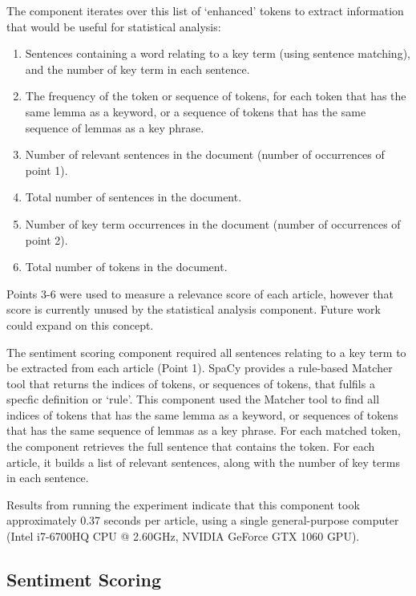 \documentclass{report}
\begin{document}
The component iterates over this list of `enhanced' tokens to extract information that would be useful for statistical analysis:
\begin{enumerate}
	\item Sentences containing a word relating to a key term (using sentence matching), and the number of key term in each sentence.
	\item The frequency of the token or sequence of tokens, for each token that has the same lemma as a keyword, or a sequence of tokens that has the same sequence of lemmas as a key phrase.
	\item Number of relevant sentences in the document (number of occurrences of point 1).
	\item Total number of sentences in the document.
	\item Number of key term occurrences in the document (number of occurrences of point 2).
	\item Total number of tokens in the document.
\end{enumerate}

Points 3-6 were used to measure a relevance score of each article, however that score is currently unused by the statistical analysis component. 
Future work could expand on this concept.

The sentiment scoring component required all sentences relating to a key term to be extracted from each article (Point 1).
SpaCy provides a rule-based Matcher tool that returns the indices of tokens, or sequences of tokens, that fulfils a specfic definition or `rule'.
This component used the Matcher tool to find all indices of tokens that has the same lemma as a keyword, or sequences of tokens that has the same sequence of lemmas as a key phrase.
For each matched token, the component retrieves the full sentence that contains the token. 
For each article, it builds a list of relevant sentences, along with the number of key terms in each sentence.

Results from running the experiment indicate that this component took approximately 0.37 seconds per article, using a single general-purpose computer (Intel i7-6700HQ CPU @ 2.60GHz, NVIDIA GeForce GTX 1060 GPU).

\subsection{Sentiment Scoring} \label{des-sentiment}
\end{document}

